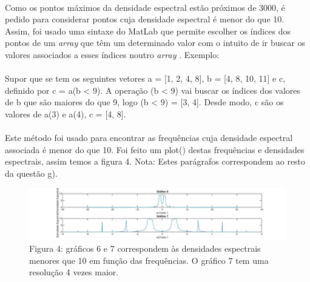 \documentclass[a4paper, 11pt]{article}
\newcommand{\arr}{\textit{array} }
\begin{document}
	\paragraph{}
	Como os pontos máximos da densidade espectral estão próximos de 3000, é pedido para considerar pontos cuja densidade espectral é menor do que 10. Assim, foi usado uma sintaxe do MatLab que permite escolher os índices dos pontos de um \arr que têm um determinado valor com o intuito de ir buscar os valores associados a esses índices noutro \arr. Exemplo:
	\paragraph{}
	Supor que se tem os seguintes vetores {\selectfont a = [1, 2, 4, 8]}, {\selectfont b = [4, 8, 10, 11]} e  {\selectfont c}, definido por {\selectfont c = a(b < 9)}. A operação {\selectfont (b < 9)} vai buscar os índices dos valores de {\selectfont b} que são maiores do que 9, logo {\selectfont (b < 9) = [3, 4]}. Desde modo, {\selectfont c} são os valores de {\selectfont a(3)} e {\selectfont a(4)}, {\selectfont c = [4, 8]}.
	\paragraph{}
	Este método foi usado para encontrar as frequências cuja densidade espectral associada é menor do que 10. Foi feito um {\selectfont plot()} destas frequências e densidades espectrais, assim temos a figura 4. 
	\newline
	{\footnotesize Nota: Estes parágrafos correspondem ao resto da questão g).}
	\begin{figure}[h]
		\centering
		\captionsetup{labelformat=empty}
		\includegraphics[scale=0.4]{parteB_2}
		\caption{\scriptsize Figura 4: gráficos 6 e 7 correspondem às densidades espectrais menores que 10 em função das frequências. O gráfico 7 tem uma resolução 4 vezes maior.}
	\end{figure}
\end{document}
